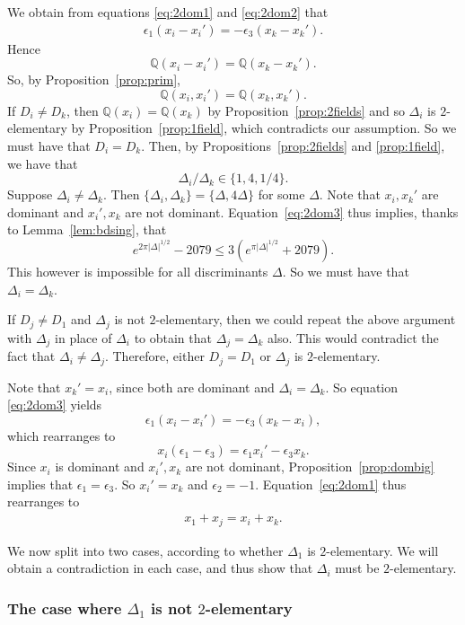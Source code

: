 \documentclass[12pt,a4paper,oneside]{amsart}
\begin{document}
We obtain from equations \eqref{eq:2dom1} and \eqref{eq:2dom2} that
\begin{align}\label{eq:2dom3}
    \epsilon_1 (x_i - x_i') = -\epsilon_3 (x_k - x_k').
\end{align} 
Hence
\[ \mathbb{Q}(x_i - x_i') = \mathbb{Q} (x_k - x_k').\]
So, by Proposition~\ref{prop:prim},
\[ \mathbb{Q}(x_i, x_i') = \mathbb{Q}(x_k, x_k').\]
If $D_i \neq D_k$, then $\mathbb{Q}(x_i) = \mathbb{Q}(x_k)$ by Proposition~\ref{prop:2fields} and so $\Delta_i$ is $2$-elementary by Proposition~\ref{prop:1field}, which contradicts our assumption. So we must have that $D_i = D_k$. Then, by Propositions~\ref{prop:2fields} and \ref{prop:1field}, we have that 
\[\Delta_i / \Delta_k \in \{1, 4, 1/4\}.\] 
Suppose $\Delta_i \neq \Delta_k$. Then $\{\Delta_i, \Delta_k\} = \{\Delta, 4 \Delta\}$ for some $\Delta$. Note that $x_i, x_k'$ are dominant and $x_i', x_k$ are not dominant. Equation~\eqref{eq:2dom3} thus implies, thanks to Lemma~\ref{lem:bdsing}, that
\[ e^{2 \pi \lvert \Delta \rvert^{1/2}} -2079 \leq 3(e^{\pi \lvert \Delta \rvert^{1/2}} + 2079).\]
This however is impossible for all discriminants $\Delta$. So we must have that $\Delta_i = \Delta_k$.

 If $D_j \neq D_1$ and $\Delta_j$ is not $2$-elementary, then we could repeat the above argument with $\Delta_j$ in place of $\Delta_i$ to obtain that $\Delta_j = \Delta_k$ also. This would contradict the fact that $\Delta_i \neq \Delta_j$. Therefore, either $D_j = D_1$ or $\Delta_j$ is $2$-elementary.

Note that $x_k' = x_i$, since both are dominant and $\Delta_i = \Delta_k$. So equation \eqref{eq:2dom3} yields
\[ \epsilon_1 (x_i - x_i') = - \epsilon_3 (x_k - x_i),\]
which rearranges to
\[ x_i( \epsilon_1 - \epsilon_3) = \epsilon_1 x_i' - \epsilon_3 x_k.\]
Since $x_i$ is dominant and $x_i', x_k$ are not dominant, Proposition~\ref{prop:dombig} implies that $\epsilon_1 = \epsilon_3$. So $x_i' = x_k$ and $\epsilon_2 = -1$. Equation~\eqref{eq:2dom1} thus rearranges to
\begin{align}\label{eq:bad}
	x_1 + x_j = x_i + x_k.
\end{align}

We now split into two  cases, according to whether $\Delta_1$ is $2$-elementary. We will obtain a contradiction in each case, and thus show that $\Delta_i$ must be $2$-elementary.

\subsubsection{The case where $\Delta_1$ is not $2$-elementary}\label{subsub:Delta1not2elem}
\end{document}
